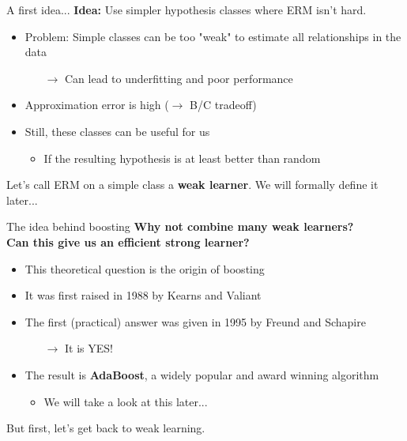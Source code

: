 \begin{frame}{A first idea...}
    \textbf{Idea:} Use simpler hypothesis classes where ERM isn't hard.

    \pause    
    
    \begin{itemize}
        \item Problem: Simple classes can be too "weak" to estimate all relationships in the data
        \begin{itemize}
            \item[$\rightarrow$] Can lead to underfitting and poor performance
        \end{itemize} \pause
        \item Approximation error is high ($\rightarrow$ B/C tradeoff) \pause
        \item Still, these classes can be useful for us
        \begin{itemize}
            \item If the resulting hypothesis is at least better than random
        \end{itemize}
    \end{itemize}

    \pause    
    
    Let's call ERM on a simple class a \textbf{weak learner}. We will formally define it later...
\end{frame}

\begin{frame}{The idea behind boosting} \pause
    \textbf{Why not combine many weak learners?}\\
    \textbf{Can this give us an efficient strong learner?}
    
    \pause    
    
    \begin{itemize}
        \item This theoretical question is the origin of boosting \pause
        \item It was first raised in 1988 by Kearns and Valiant~\cite{kv-lbffahf-88} \pause
        \item The first (practical) answer was given in 1995 by Freund and Schapire~\cite{FREUND1997119}
        \begin{itemize}
            \item[$\rightarrow$] It is YES!
        \end{itemize} \pause
        \item The result is \textbf{AdaBoost}, a widely popular and award winning algorithm
        \begin{itemize}
            \item We will take a look at this later...
        \end{itemize}
    \end{itemize}

    \pause    
    
    But first, let's get back to weak learning.
\end{frame}